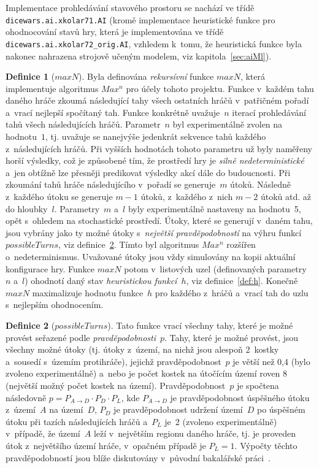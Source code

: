 \documentclass[11pt, a4paper]{article}
\theoremstyle{definition}
\newtheorem{definition}{Definice}[section]
\begin{document}
Implementace prohledávání stavového prostoru se nachází ve třídě
\texttt{dicewars.ai.xkolar71.AI} (kromě implementace heuristické funkce
pro ohodnocování stavů hry, která je implementována ve třídě
\texttt{dicewars.ai.xkolar72\_orig.AI}, vzhledem k~tomu, že heuristická funkce
byla nakonec nahrazena strojově učeným modelem, viz kapitola~\ref{sec:aiMl}).

\medskip

\begin{definition}[$ maxN $]
Byla definována \emph{rekursívní} funkce $ maxN $, která implementuje
algoritmus $ Max^n $ pro účely tohoto projektu. Funkce v~každém tahu daného
hráče zkoumá následující tahy všech ostatních hráčů v~patřičném pořadí
a~vrací nejlepší spočítaný tah. Funkce konkrétně uvažuje~$ n $ iterací
prohledávání tahů všech následujících hráčů. Parametr~$ n $ byl
experimentálně zvolen na hodnotu~$ 1 $, tj. uvažuje se nanejvýše jedenkrát
sekvence tahů každého z~následujících hráčů. Při vyšších hodnotách tohoto
parametru už byly naměřeny horší výsledky, což je způsobené tím, že prostředí
hry je \emph{silně nedeterministické} a~jen obtížně lze přesněji predikovat
výsledky akcí dále do budoucnosti. Při zkoumání tahů hráče následujícího
v~pořadí se generuje~$ m $ útoků. Následně z~každého útoku se generuje
$ m - 1 $ útoků, z~každého z~nich $ m - 2 $ útoků atd. až do hloubky~$ l $.
Parametry~$ m $ a~$ l $ byly experimentálně nastaveny na hodnotu~5, opět
s~ohledem na stochastické prostředí. Útoky, které se generují v~daném
tahu, jsou vybrány jako ty možné útoky s~\emph{největší pravděpodobností} na
výhru funkcí $ possibleTurns $, viz definice~\ref{def:possTurns}. Tímto
byl algoritmus $ Max^n $ rozšířen o~nedeterminismus. Uvažované útoky jsou
vždy simulovány na kopii aktuální konfigurace hry. Funkce $ maxN $ potom
v~listových uzel (definovaných parametry~$ n $ a~$ l $) ohodnotí daný stav
\emph{heuristickou funkcí}~$ h $, viz definice~\ref{def:h}. Konečně $ maxN $
maximalizuje hodnotu funkce~$ h $ pro každého z~hráčů a~vrací tah do uzlu
s~nejlepším ohodnocením.
\end{definition}

\medskip

\begin{definition}[$ possibleTurns $]
\label{def:possTurns}
Tato funkce vrací všechny tahy, které je možné provést seřazené podle
\emph{pravděpodobnosti}~$ p $. Tahy, které je možné provést, jsou
všechny možné útoky (tj. útoky z~území, na nichž jsou alespoň 2~kostky
a~sousedí s~územím protihráče), jejichž pravděpodobnost~$ p $
je větší než 0,4 (bylo zvoleno experimentálně) a~nebo je počet kostek
na útočícím území roven 8 (největší možný počet kostek na území).
Pravděpodobnost~$ p $ je spočtena následovně $ p = P_{A \rightarrow D}
\cdot P_D \cdot P_L $, kde $ P_{A \rightarrow D} $ je pravděpodobnost
úspěšného útoku z~území~$ A $ na území~$ D $, $ P_D $ je pravděpodobnost
udržení území~$ D $ po úspěšném útoku při tazích následujících hráčů
a~$ P_L $ je~2 (zvoleno experimentálně) v~případě, že území~$ A $ leží
v~největším regionu daného hráče, tj. je proveden útok z~největšího území
hráče, v~opačném případě je $ P_L = 1 $. Výpočty těchto pravděpodobností
jsou blíže diskutovány v~původní bakalářské práci~\cite{turecekBP}.
\end{definition}
\end{document}
